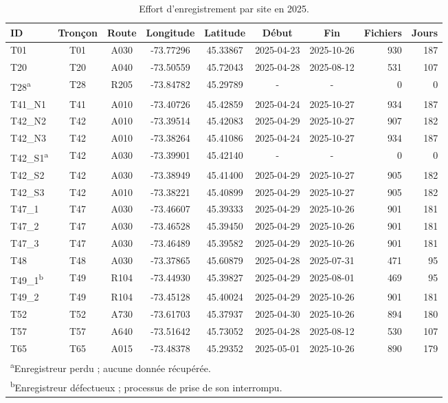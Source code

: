 \begin{table}[H]
\centering
\caption{Effort d'enregistrement par site en 2025.} 
\label{tab:tab_AM25}
\begin{tabular}{lccccccrr}
  \toprule
ID & Tronçon & Route & Longitude & Latitude & Début & Fin & Fichiers & Jours \\ 
  \midrule
T01 & T01 & A030 & -73.77296 & 45.33867 &2025-04-23 & 2025-10-26 & 930 & 187  \\ 
  T20 & T20 & A040 & -73.50559 & 45.72043 &2025-04-28 & 2025-08-12 & 531 & 107  \\ 
  T28\textsuperscript{a} & T28 & R205 & -73.84782 & 45.29789 & - & - & 0 & 0  \\ 
  T41\_N1 & T41 & A010 & -73.40726 & 45.42859 & 2025-04-24 & 2025-10-27 & 934 & 187  \\ 
  T42\_N2 & T42 & A010 & -73.39514 & 45.42083 & 2025-04-29 & 2025-10-27  & 907 & 182  \\ 
  T42\_N3 & T42 & A010 & -73.38264 & 45.41086 & 2025-04-24 & 2025-10-27 & 934 & 187  \\ 
  T42\_S1\textsuperscript{a} & T42 & A030 & -73.39901 & 45.42140 & - & - & 0 & 0 \\
  T42\_S2 & T42 & A030 & -73.38949 & 45.41400 & 2025-04-29 & 2025-10-27 & 905 & 182  \\ 
  T42\_S3 & T42 & A010 & -73.38221 & 45.40899 & 2025-04-29 & 2025-10-27   & 905 & 182  \\ 
  T47\_1 & T47 & A030 & -73.46607 & 45.39333 & 2025-04-29 & 2025-10-26   & 901 & 181  \\ 
  T47\_2 & T47 & A030 & -73.46528 & 45.39450 & 2025-04-29 & 2025-10-26  & 901 & 181  \\ 
  T47\_3 & T47& A030 & -73.46489 & 45.39582 & 2025-04-29 & 2025-10-26 & 901 & 181  \\ 
  T48 & T48 & A030 & -73.37865 & 45.60879 & 2025-04-28 & 2025-07-31 & 471 &  95 \\ 
  T49\_1\textsuperscript{b} & T49 & R104 & -73.44930 & 45.39827 & 2025-04-29 & 2025-08-01  & 469 &  95  \\ 
  T49\_2 & T49 & R104 & -73.45128 & 45.40024 & 2025-04-29 & 2025-10-26 & 901 & 181  \\ 
  T52 & T52 & A730 & -73.61703 & 45.37937 & 2025-04-30 & 2025-10-26 & 894 & 180  \\ 
  T57 & T57 & A640 & -73.51642 & 45.73052 & 2025-04-28 & 2025-08-12 & 530 & 107 \\ 
  T65 & T65 & A015 & -73.48378 & 45.29352 & 2025-05-01 & 2025-10-26 & 890 & 179  \\ 
\bottomrule
  \multicolumn{9}{l}{\footnotesize\textsuperscript{a}Enregistreur perdu ; aucune donnée récupérée.} \\
  \multicolumn{9}{l}{\footnotesize\textsuperscript{b}Enregistreur défectueux ; processus de prise de son interrompu.} \\
\end{tabular}
\end{table}


